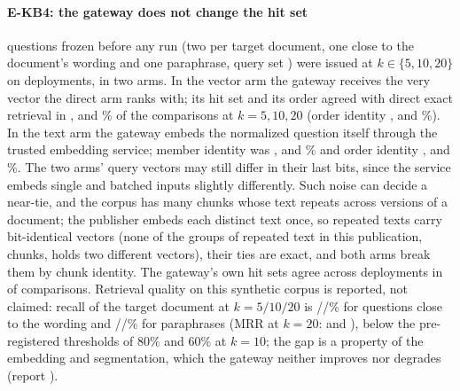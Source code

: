\documentclass[journal,onecolumn]{IEEEtran}
\begin{document}
\paragraph{E-KB4: the gateway does not change the hit set}
\KbEkbFourQueries{} questions frozen before any run (two per target
document, one close to the document's wording and one paraphrase, query set
\KbEkbFourQuerysetDigest) were issued at $k\in\{5,10,20\}$ on
\KbEkbFourDeployments{} deployments, in two arms. In the vector arm the
gateway receives the very vector the direct arm ranks with; its hit set and
its order agreed with direct exact retrieval in
\KbEkbFourVectorIdentityKFive, \KbEkbFourVectorIdentityKTen{} and
\KbEkbFourVectorIdentityKTwenty\% of the comparisons at $k=5,10,20$ (order
identity \KbEkbFourVectorSameOrderKFive, \KbEkbFourVectorSameOrderKTen{} and
\KbEkbFourVectorSameOrderKTwenty\%). In the text arm the gateway embeds the
normalized question itself through the trusted embedding service; member
identity was \KbEkbFourIdentityKFive, \KbEkbFourIdentityKTen{} and
\KbEkbFourIdentityKTwenty\% and order identity \KbEkbFourSameOrderKFive,
\KbEkbFourSameOrderKTen{} and \KbEkbFourSameOrderKTwenty\%. The two arms' query vectors may still differ
in their last bits, since the service embeds single and batched inputs
slightly differently. Such noise can decide a near-tie, and the corpus has
many chunks whose text repeats across versions of a document; the publisher
embeds each distinct text once, so repeated texts carry bit-identical vectors
(none of the \KbEkbFourRepeatedTextGroups{} groups of repeated text in this
publication, \KbEkbFourRepeatedTextChunks{} chunks, holds two different
vectors), their ties are exact, and both arms break them by chunk identity. The gateway's own hit
sets agree across deployments in \KbEkbFourCrossIdentical{} of
\KbEkbFourCrossTotal{} comparisons. Retrieval
quality on this synthetic corpus is reported, not claimed: recall of the
target document at $k=5/10/20$ is
\KbEkbFourRecallVerbatimKFive/\KbEkbFourRecallVerbatimKTen/\KbEkbFourRecallVerbatimKTwenty\%
for questions close to the wording and
\KbEkbFourRecallParaphraseKFive/\KbEkbFourRecallParaphraseKTen/\KbEkbFourRecallParaphraseKTwenty\%
for paraphrases (MRR at $k=20$: \KbEkbFourMrrVerbatim{} and
\KbEkbFourMrrParaphrase), below the pre-registered thresholds of 80\% and
60\% at $k=10$; the gap is a property of the embedding and segmentation,
which the gateway neither improves nor degrades (report \KbEkbFourReportDigest).
\end{document}
